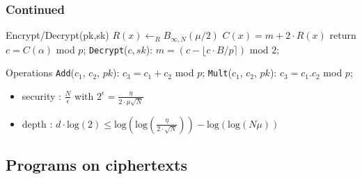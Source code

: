 \documentclass{beamer}
\begin{document}
\begin{frame} \frametitle{Continued}
\begin{block}{Encrypt/Decrypt(pk,sk)}
 $R(x) \leftarrow_{R}B_{\infty , N}(\mu/2)$
    \; $C(x)=m+2\cdot R(x)$ 
    \newline \phantom{x}\hspace{3ex} return  $c=C(\alpha)$ mod $p$;
    \newline \texttt{Decrypt}($c, sk$):
    \newline \phantom{x}\hspace{3ex} $m = (c - \lfloor c \cdot B/p \rceil )$ mod $2$;
\end{block}
\pause
\begin{block}{Operations}
    \texttt{Add}($c_1$, $c_2$, $pk$):
    \newline \phantom{x}\hspace{3ex} $c_3=c_1+c_2$ mod $p$; 
    \newline \texttt{Mult}($c_1$, $c_2$, $pk$):
    \newline \phantom{x}\hspace{3ex}  $c_3=c_1.c_2$ mod $p$; 
\end{block}
\pause
\begin{itemize}
  \item security : $\frac{N}{\epsilon}$ with $2 ^ \epsilon = \frac{\eta}{2\cdot \mu \sqrt{N}} $
  \item depth :  $d \cdot \mathrm{log}(2) \leq  \mathrm{log}\left( \mathrm{log}\left(\frac{\eta}{2\cdot \sqrt{N}}\right) \right) - \mathrm{log}\left(\mathrm{log}\left( N\mu\right)\right)$
  \end{itemize}
\end{frame}

\subsection{Programs on ciphertexts}
\end{document}
